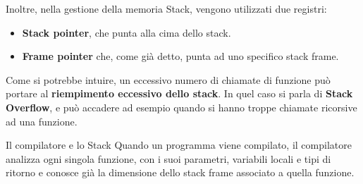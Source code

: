 \documentclass[12pt]{report}
\begin{document}
	Inoltre, nella gestione della memoria Stack, vengono utilizzati due registri:
	\begin{itemize}
		\item \textbf{Stack pointer}, che punta alla cima dello stack.
		
		\item \textbf{Frame pointer} che, come già detto, punta ad uno specifico stack frame.
	\end{itemize}
	
	Come si potrebbe intuire, un eccessivo numero di chiamate di funzione può portare al \textbf{riempimento eccessivo dello stack}. In quel caso si parla di \textbf{Stack Overflow}, e può accadere ad esempio quando si hanno troppe chiamate ricorsive ad una funzione.
	
	\begin{osservazione}{Il compilatore e lo Stack}{}
		Quando un programma viene compilato, il compilatore analizza ogni singola funzione, con i suoi parametri, variabili locali e tipi di ritorno e conosce già la dimensione dello stack frame associato a quella funzione.
	\end{osservazione}
	
\end{document}

